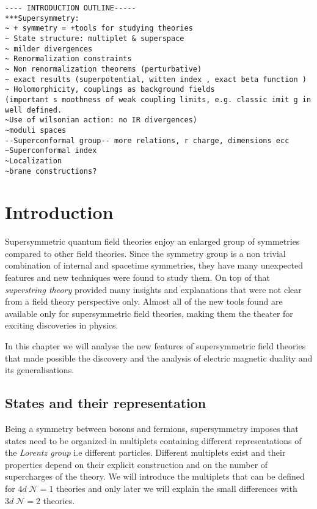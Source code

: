 \begin{lstlisting}
---- INTRODUCTION OUTLINE-----
***Supersymmetry:
~ + symmetry = +tools for studying theories
~ State structure: multiplet & superspace
~ milder divergences 
~ Renormalization constraints
~ Non renormalization theorems (perturbative)
~ exact results (superpotential, witten index , exact beta function )
~ Holomorphicity, couplings as background fields 
(important s moothness of weak coupling limits, e.g. classic imit g in  well defined.
~Use of wilsonian action: no IR divergences)
~moduli spaces
--Superconformal group-- more relations, r charge, dimensions ecc
~Superconformal index
~Localization
~brane constructions?
\end{lstlisting}

\section{Introduction}
Supersymmetric quantum field theories enjoy an enlarged group of  symmetries compared to other field theories. 
Since the symmetry group is a non trivial combination of internal and spacetime symmetries, they have many unexpected features and new techniques were found to study them.
On top of that \emph{superstring theory} provided many insights and explanations that were not clear from a field theory perspective only. 
Almost all of the new tools found are available only for supersymmetric field theories, making them the theater for exciting discoveries in physics.

In this chapter we will analyse the new features of supersymmetric field theories that made possible the discovery and the analysis of electric magnetic duality and its generalisations.

\subsection{ States and their representation}

Being a symmetry between bosons and fermions, supersymmetry imposes that states need to be organized in multiplets containing different representations of the \emph{Lorentz group} i.e different particles.
Different multiplets exist and their properties depend on their explicit construction and on the number of supercharges of the theory. 
We will introduce the multiplets that can be defined for $4d \; \mathcal{N} = 1$ theories and only later we will explain the small differences with $3d \; \mathcal{N} = 2$ theories.

